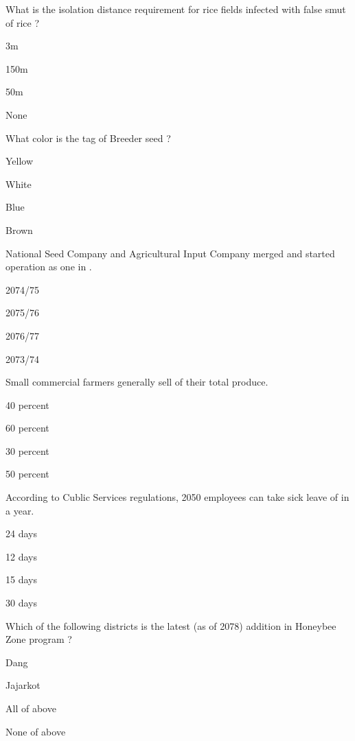 \begin{questions}
\question What is the isolation distance requirement for rice fields infected with false smut of rice ?
\begin{items}
\item 3m
\item 150m
\item 50m
\item None
\end{items}

\question What color is the tag of Breeder seed ?
\begin{items}
\item Yellow
\item White
\item Blue
\item Brown
\end{items}

\question National Seed Company and Agricultural Input Company merged and started operation as one in \fillin[][3cm].
\begin{items}
\item 2074/75
\item 2075/76
\item 2076/77
\item 2073/74
\end{items}

\question Small commercial farmers generally sell \fillin[][3cm] of their total produce.
\begin{items}
\item 40 percent
\item 60 percent
\item 30 percent
\item 50 percent
\end{items}

\question According to Cublic Services regulations, 2050 employees can take sick leave of \fillin[][3cm] in a year.
\begin{items}
\item 24 days
\item 12 days
\item 15 days
\item 30 days
\end{items}

\question Which of the following districts is the latest (as of 2078) addition in Honeybee Zone program ?
\begin{items}
\item Dang
\item Jajarkot
\item All of above
\item None of above
\end{items}


\end{questions}
